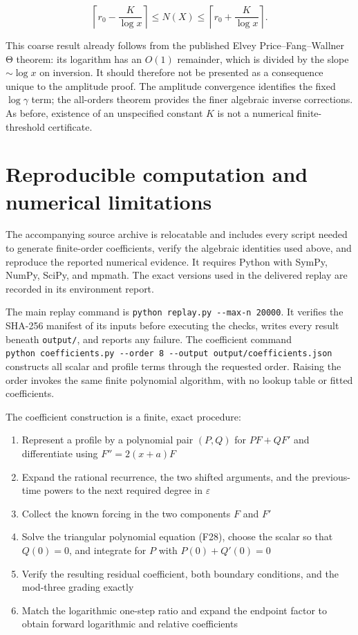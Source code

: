 \documentclass[11pt,letterpaper]{article}
\numberwithin{equation}{section}
\theoremstyle{remark}
\providecommand{\tightlist}{\setlength{\itemsep}{0pt}\setlength{\parskip}{0pt}}
\begin{document}
\[
\left\lceil r_0-\frac K{\log x}\right\rceil
\le N(X)\le
\left\lceil r_0+\frac K{\log x}\right\rceil.
\]

This coarse result already follows from the published Elvey Price--Fang--Wallner Θ theorem: its logarithm has an \(O(1)\) remainder, which is divided by the slope \(\sim \log x\) on inversion. It should therefore not be presented as a consequence unique to the amplitude proof. The amplitude convergence identifies the fixed \(\log \gamma\) term; the all-orders theorem provides the finer algebraic inverse corrections. As before, existence of an unspecified constant \(K\) is not a numerical finite-threshold certificate.

\section{Reproducible computation and numerical limitations}\label{air:rb:reproducible-computation-and-numerical-limitations}

The accompanying source archive is relocatable and includes every script needed to generate finite-order coefficients, verify the algebraic identities used above, and reproduce the reported numerical evidence. It requires Python with SymPy, NumPy, SciPy, and mpmath. The exact versions used in the delivered replay are recorded in its environment report.

The main replay command is \texttt{python\ replay.py\ -\/-max-n\ 20000}. It verifies the SHA-256 manifest of its inputs before executing the checks, writes every result beneath \texttt{output/}, and reports any failure. The coefficient command \texttt{python\ coefficients.py\ -\/-order\ 8\ -\/-output\ output/coefficients.json} constructs all scalar and profile terms through the requested order. Raising the order invokes the same finite polynomial algorithm, with no lookup table or fitted coefficients.

The coefficient construction is a finite, exact procedure:

\begin{enumerate}
\def\labelenumi{\arabic{enumi}.}
\tightlist
\item
  Represent a profile by a polynomial pair \((P,Q)\) for \(PF+QF'\) and differentiate using \(F''=2(x+a)F\)
\item
  Expand the rational recurrence, the two shifted arguments, and the previous-time powers to the next required degree in \(\varepsilon\)
\item
  Collect the known forcing in the two components \(F\) and \(F'\)
\item
  Solve the triangular polynomial equation (F28), choose the scalar so that \(Q(0)=0\), and integrate for \(P\) with \(P(0)+Q'(0)=0\)
\item
  Verify the resulting residual coefficient, both boundary conditions, and the mod-three grading exactly
\item
  Match the logarithmic one-step ratio and expand the endpoint factor to obtain forward logarithmic and relative coefficients
\end{enumerate}
\end{document}
